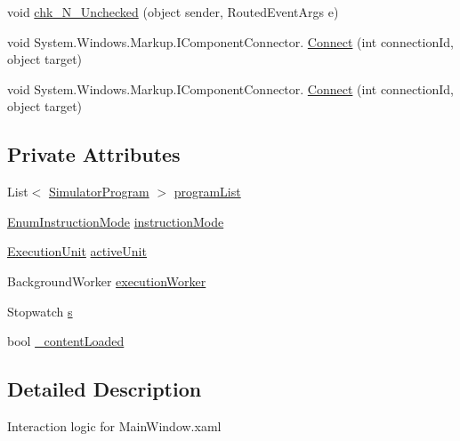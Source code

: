 \begin{DoxyCompactItemize}
\item 
void \hyperlink{class_c_p_u___o_s___simulator_1_1_main_window_afd6ed1a3f1774365c49977ca74daa906}{chk\+\_\+\+N\+\_\+\+Unchecked} (object sender, Routed\+Event\+Args e)
\item 
void System.\+Windows.\+Markup.\+I\+Component\+Connector. \hyperlink{class_c_p_u___o_s___simulator_1_1_main_window_ae66177a5319cf24975b9dfab71bc830e}{Connect} (int connection\+Id, object target)
\item 
void System.\+Windows.\+Markup.\+I\+Component\+Connector. \hyperlink{class_c_p_u___o_s___simulator_1_1_main_window_ae66177a5319cf24975b9dfab71bc830e}{Connect} (int connection\+Id, object target)
\end{DoxyCompactItemize}
\subsection*{Private Attributes}
\begin{DoxyCompactItemize}
\item 
List$<$ \hyperlink{class_c_p_u___o_s___simulator_1_1_c_p_u_1_1_simulator_program}{Simulator\+Program} $>$ \hyperlink{class_c_p_u___o_s___simulator_1_1_main_window_a48fa4dc074c098338a652dbd6a3434c7}{program\+List}
\item 
\hyperlink{namespace_c_p_u___o_s___simulator_adc17a5a5e004084f05dc8e4d3f70e31f}{Enum\+Instruction\+Mode} \hyperlink{class_c_p_u___o_s___simulator_1_1_main_window_adcf36837be53f52843bbeb354a16d15c}{instruction\+Mode}
\item 
\hyperlink{class_c_p_u___o_s___simulator_1_1_c_p_u_1_1_execution_unit}{Execution\+Unit} \hyperlink{class_c_p_u___o_s___simulator_1_1_main_window_af00ce05444d9636c688974f706ef397b}{active\+Unit}
\item 
Background\+Worker \hyperlink{class_c_p_u___o_s___simulator_1_1_main_window_a80e0a87480e4b7f4cfdb47739985b7c7}{execution\+Worker}
\item 
Stopwatch \hyperlink{class_c_p_u___o_s___simulator_1_1_main_window_a880dc01f7c4f093b77ace064d93be1f3}{s}
\item 
bool \hyperlink{class_c_p_u___o_s___simulator_1_1_main_window_ae8269f86a68d5fdf06180686fc947cc6}{\+\_\+content\+Loaded}
\end{DoxyCompactItemize}


\subsection{Detailed Description}
Interaction logic for Main\+Window.\+xaml 

